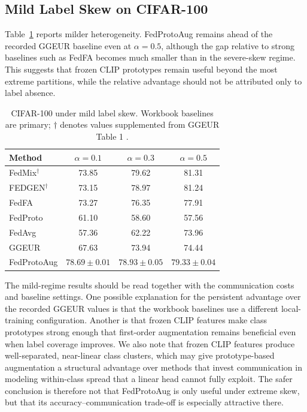﻿\documentclass[runningheads]{llncs}
\newcommand{\method}{FedProtoAug}
\newcommand{\clip}{CLIP}
\begin{document}
\subsection{Mild Label Skew on CIFAR-100}
Table~\ref{tab:cifar100_mild} reports milder heterogeneity. \method{} remains ahead of the recorded GGEUR baseline even at $\alpha=0.5$, although the gap relative to strong baselines such as FedFA becomes much smaller than in the severe-skew regime. This suggests that frozen \clip{} prototypes remain useful beyond the most extreme partitions, while the relative advantage should not be attributed only to label absence.

\begin{table}[t]
\centering
\caption{CIFAR-100 under mild label skew. Workbook baselines are primary; $\dagger$ denotes values supplemented from GGEUR Table 1 \cite{ma2025ggeur}.}
\label{tab:cifar100_mild}
\begin{tabular}{lccc}
\toprule
Method & $\alpha=0.1$ & $\alpha=0.3$ & $\alpha=0.5$ \\
\midrule
FedMix$^\dagger$ & 73.85 & 79.62 & 81.31 \\
FEDGEN$^\dagger$ & 73.15 & 78.97 & 81.24 \\
FedFA & 73.27 & 76.35 & 77.91 \\
FedProto & 61.10 & 58.60 & 57.56 \\
FedAvg & 57.36 & 62.22 & 73.96 \\
GGEUR & 67.63 & 73.94 & 74.44 \\
\method{} & $78.69\pm0.01$ & $78.93\pm0.05$ & $79.33\pm0.04$ \\
\bottomrule
\end{tabular}
\end{table}

The mild-regime results should be read together with the communication costs and baseline settings. One possible explanation for the persistent advantage over the recorded GGEUR values is that the workbook baselines use a different local-training configuration. Another is that frozen \clip{} features make class prototypes strong enough that first-order augmentation remains beneficial even when label coverage improves. We also note that frozen \clip{} features produce well-separated, near-linear class clusters, which may give prototype-based augmentation a structural advantage over methods that invest communication in modeling within-class spread that a linear head cannot fully exploit. The safer conclusion is therefore not that \method{} is only useful under extreme skew, but that its accuracy--communication trade-off is especially attractive there.
\end{document}

